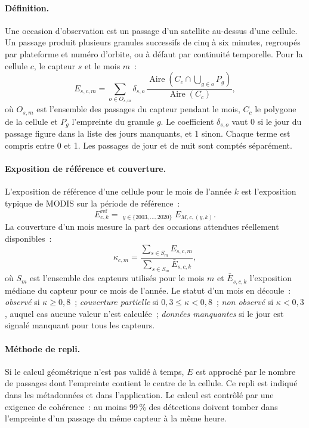 \documentclass[11pt,a4paper]{article}
\DeclareMathOperator{\med}{m\acute{e}d}
\DeclareMathOperator{\Aire}{Aire}
\begin{document}
\paragraph{Définition.} Une occasion d'observation est un passage d'un satellite au-dessus d'une cellule. Un passage produit plusieurs granules successifs de cinq à six minutes, regroupés par plateforme et numéro d'orbite, ou à défaut par continuité temporelle. Pour la cellule $c$, le capteur $s$ et le mois $m$~:
\begin{equation}
  E_{s,c,m} = \sum_{o\in O_{s,m}} \delta_{s,o}\, \frac{\Aire\!\left(C_c \cap \bigcup_{g\in o} P_g\right)}{\Aire(C_c)},
  \label{eq:occasions}
\end{equation}
où $O_{s,m}$ est l'ensemble des passages du capteur pendant le mois, $C_c$ le polygone de la cellule et $P_g$ l'empreinte du granule $g$. Le coefficient $\delta_{s,o}$ vaut 0 si le jour du passage figure dans la liste des jours manquants, et 1 sinon. Chaque terme est compris entre 0 et 1. Les passages de jour et de nuit sont comptés séparément.

\paragraph{Exposition de référence et couverture.} L'exposition de référence d'une cellule pour le mois de l'année $k$ est l'exposition typique de MODIS sur la période de référence~:
\begin{equation}
  E^{\text{ref}}_{c,k} = \med_{y\in\{2003,\dots,2020\}} E_{M,c,(y,k)}.
\end{equation}
La couverture d'un mois mesure la part des occasions attendues réellement disponibles~:
\begin{equation}
  \kappa_{c,m} = \frac{\sum_{s\in S_m} E_{s,c,m}}{\sum_{s\in S_m} \bar E_{s,c,k}},
\end{equation}
où $S_m$ est l'ensemble des capteurs utilisés pour le mois $m$ et $\bar E_{s,c,k}$ l'exposition médiane du capteur pour ce mois de l'année. Le statut d'un mois en découle~: \emph{observé} si $\kappa \ge 0{,}8$~; \emph{couverture partielle} si $0{,}3 \le \kappa < 0{,}8$~; \emph{non observé} si $\kappa < 0{,}3$, auquel cas aucune valeur n'est calculée~; \emph{données manquantes} si le jour est signalé manquant pour tous les capteurs.

\paragraph{Méthode de repli.} Si le calcul géométrique n'est pas validé à temps, $E$ est approché par le nombre de passages dont l'empreinte contient le centre de la cellule. Ce repli est indiqué dans les métadonnées et dans l'application. Le calcul est contrôlé par une exigence de cohérence~: au moins 99\,\% des détections doivent tomber dans l'empreinte d'un passage du même capteur à la même heure.
\end{document}
